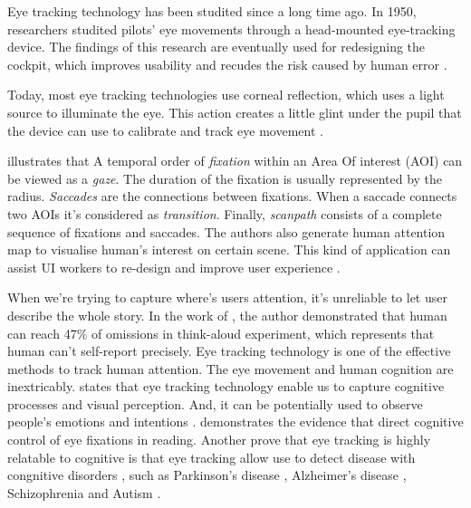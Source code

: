 
Eye tracking technology has been studited since a long time ago. In 1950, researchers studited pilots' eye movements through a head-mounted eye-tracking device. The findings of this research are eventually used for redesigning the cockpit, which improves usability and recudes the risk caused by human error \citep{Fitts2005Cockpit, Cooke2005EyeTrackingUsability}.

Today, most eye tracking technologies use corneal reflection, which uses a light source to illuminate the eye. This action creates a little glint under the pupil that the device can use to calibrate and track eye movement \citep{Schall2014EyeTrackingIntro, Fitts2005Cockpit}.

\citet{Blascheck2014VisualisingEyeTracking} illustrates that A temporal order of \textit{fixation} within an Area Of interest (AOI) can be viewed as a \textit{gaze}. The duration of the fixation is usually represented by the radius. \textit{Saccades} are the connections between fixations. When a saccade connects two AOIs it's considered as  \textit{transition}. Finally, \textit{scanpath} consists of a complete sequence of fixations and saccades. The authors also generate human attention map to visualise human's interest on certain scene. This kind of application can assist UI workers to re-design and improve user experience \citep{Schall2014EyeTrackingIntro}.

When we're trying to capture where's users attention, it's unreliable to let user describe the whole story. In the work of \citet{Guan2006ThinkAloud}, the author demonstrated that human can reach 47\% of omissions in think-aloud experiment, which represents that human can't self-report precisely. Eye tracking technology is one of the effective methods to track human attention. The eye movement and human cognition are inextricably. \citep{Schall2014EyeTrackingIntro} states that eye tracking technology enable us to capture cognitive processes and visual perception. And, it can be potentially used to observe people's emotions and intentions \citep{Harezlak2018EyeTrackingInMedicine}. \citet{Rayner2015EvidenceCongnitiveFixation} demonstrates the evidence that direct cognitive control of eye fixations in reading. Another prove that eye tracking is highly relatable to cognitive is that eye tracking allow use to detect disease with congnitive disorders \citep{Harezlak2018EyeTrackingInMedicine}, such as Parkinson's disease \citep{S2016Parkinson}, Alzheimer's disease \citep{Crawford2015Alzheimer},
Schizophrenia \citep{Levy2010Schizophrenia} and Autism \citep{Belen2021Autism}.


